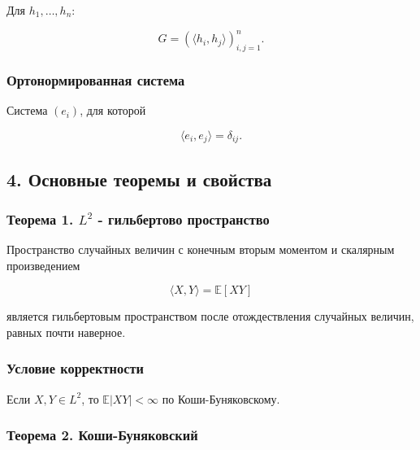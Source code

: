 \documentclass[
  11pt,
  a4paper,
]{article}
\begin{document}
Для \(h_1,\ldots,h_n\):

\[
G=(\langle h_i,h_j\rangle)_{i,j=1}^n.
\]

\subsubsection{Ортонормированная
система}\label{ux43eux440ux442ux43eux43dux43eux440ux43cux438ux440ux43eux432ux430ux43dux43dux430ux44f-ux441ux438ux441ux442ux435ux43cux430}

Система \((e_i)\), для которой

\[
\langle e_i,e_j\rangle=\delta_{ij}.
\]

\subsection{4. Основные теоремы и
свойства}\label{ux43eux441ux43dux43eux432ux43dux44bux435-ux442ux435ux43eux440ux435ux43cux44b-ux438-ux441ux432ux43eux439ux441ux442ux432ux430}

\subsubsection{\texorpdfstring{Теорема 1. \(L^2\) - гильбертово
пространство}{Теорема 1. L\^{}2 - гильбертово пространство}}\label{ux442ux435ux43eux440ux435ux43cux430-1.-l2---ux433ux438ux43bux44cux431ux435ux440ux442ux43eux432ux43e-ux43fux440ux43eux441ux442ux440ux430ux43dux441ux442ux432ux43e}

Пространство случайных величин с конечным вторым моментом и скалярным
произведением

\[
\langle X,Y\rangle=\mathbb E[XY]
\]

является гильбертовым пространством после отождествления случайных
величин, равных почти наверное.

\subsubsection{Условие
корректности}\label{ux443ux441ux43bux43eux432ux438ux435-ux43aux43eux440ux440ux435ux43aux442ux43dux43eux441ux442ux438}

Если \(X,Y\in L^2\), то \(\mathbb E|XY|<\infty\) по Коши-Буняковскому.

\subsubsection{Теорема 2.
Коши-Буняковский}\label{ux442ux435ux43eux440ux435ux43cux430-2.-ux43aux43eux448ux438-ux431ux443ux43dux44fux43aux43eux432ux441ux43aux438ux439}
\end{document}
